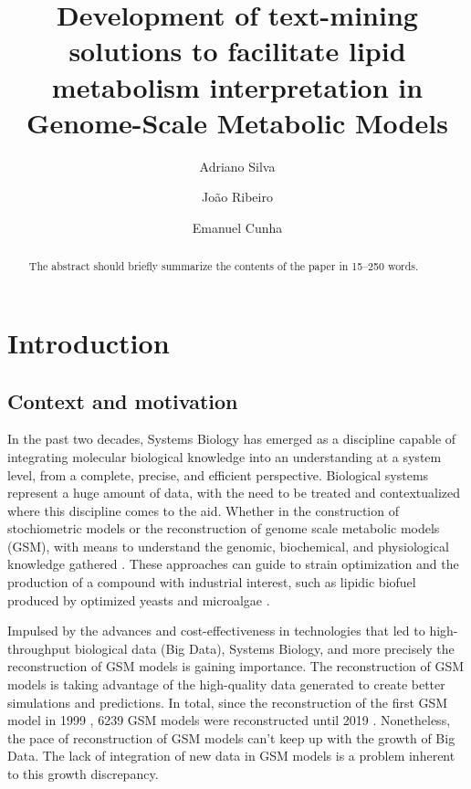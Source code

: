 \documentclass{llncs}
\begin{document}
\pagestyle{myheadings}
\title{Development of text-mining solutions to facilitate lipid metabolism interpretation in Genome-Scale Metabolic Models}

\author{Adriano Silva\and
João Ribeiro\and
Emanuel Cunha}

%
\maketitle              %
%
\begin{abstract}
The abstract should briefly summarize the contents of the paper in
15--250 words.

\end{abstract}
%
%
%
\section{Introduction}
\subsection{Context and motivation}
In the past two decades, Systems Biology has emerged as a discipline capable of integrating molecular biological knowledge into an understanding at a system level, from a complete, precise, and efficient perspective.
Biological systems represent a huge amount of data, with the need to be treated and contextualized where this discipline comes to the aid.  
Whether in the construction of stochiometric models or the reconstruction of genome scale metabolic models (GSM), with means to understand the genomic, biochemical, and physiological knowledge gathered \cite{Zou2018,Tavassoly2018}. 
These approaches can guide to strain optimization and the production of a compound with industrial interest, such as lipidic biofuel produced by optimized yeasts and microalgae \cite{Aung2013}.

Impulsed by the advances and cost-effectiveness in technologies that led to high-throughput biological data (Big Data), Systems Biology, and more precisely the reconstruction of GSM models is gaining importance.
The reconstruction of GSM models is taking advantage of the high-quality data generated to create better simulations and predictions. 
In total, since the reconstruction of the first GSM model in 1999 \cite{Edwards1999}, 6239 GSM models were reconstructed until 2019 \cite{Gu2019}. 
Nonetheless, the pace of reconstruction of GSM models can't keep up with the growth of Big Data. The lack of integration of new data in GSM models is a problem inherent to this growth discrepancy.
\end{document}
